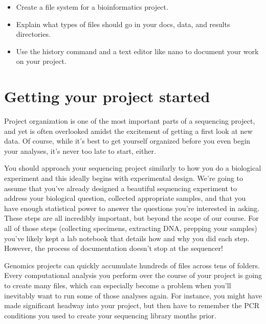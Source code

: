 \documentclass[
  letterpaper,
  DIV=11,
  numbers=noendperiod]{scrreprt}
\providecommand{\tightlist}{%
  \setlength{\itemsep}{0pt}\setlength{\parskip}{0pt}}\usepackage{longtable,booktabs,array}
\begin{document}
\begin{tcolorbox}[enhanced jigsaw, opacitybacktitle=0.6, colback=white, coltitle=black, opacityback=0, rightrule=.15mm, toptitle=1mm, toprule=.15mm, bottomtitle=1mm, colframe=quarto-callout-important-color-frame, arc=.35mm, titlerule=0mm, colbacktitle=quarto-callout-important-color!10!white, leftrule=.75mm, title={🎯 Objectives}, breakable, bottomrule=.15mm, left=2mm]

\begin{itemize}
\tightlist
\item
  Create a file system for a bioinformatics project.
\item
  Explain what types of files should go in your docs, data, and results
  directories.
\item
  Use the history command and a text editor like nano to document your
  work on your project.
\end{itemize}

\end{tcolorbox}

\section{Getting your project
started}\label{getting-your-project-started}

Project organization is one of the most important parts of a sequencing
project, and yet is often overlooked amidst the excitement of getting a
first look at new data. Of course, while it's best to get yourself
organized before you even begin your analyses, it's never too late to
start, either.

You should approach your sequencing project similarly to how you do a
biological experiment and this ideally begins with experimental design.
We're going to assume that you've already designed a beautiful
sequencing experiment to address your biological question, collected
appropriate samples, and that you have enough statistical power to
answer the questions you're interested in asking. These steps are all
incredibly important, but beyond the scope of our course. For all of
those steps (collecting specimens, extracting DNA, prepping your
samples) you've likely kept a lab notebook that details how and why you
did each step. However, the process of documentation doesn't stop at the
sequencer!

Genomics projects can quickly accumulate hundreds of files across tens
of folders. Every computational analysis you perform over the course of
your project is going to create many files, which can especially become
a problem when you'll inevitably want to run some of those analyses
again. For instance, you might have made significant headway into your
project, but then have to remember the PCR conditions you used to create
your sequencing library months prior.
\end{document}
